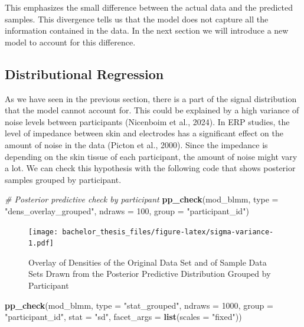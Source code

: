 \documentclass[
  doc,12pt,floatsintext]{apa7}
\newenvironment{Shaded}{\begin{snugshade}}{\end{snugshade}}
\newcommand{\AttributeTok}[1]{\textcolor[rgb]{0.13,0.29,0.53}{#1}}
\newcommand{\CommentTok}[1]{\textcolor[rgb]{0.56,0.35,0.01}{\textit{#1}}}
\newcommand{\DecValTok}[1]{\textcolor[rgb]{0.00,0.00,0.81}{#1}}
\newcommand{\FunctionTok}[1]{\textcolor[rgb]{0.13,0.29,0.53}{\textbf{#1}}}
\newcommand{\NormalTok}[1]{#1}
\newcommand{\StringTok}[1]{\textcolor[rgb]{0.31,0.60,0.02}{#1}}
\begin{document}
This emphasizes the small difference between the actual data and the predicted samples. This divergence tells us that the model does not capture all the information contained in the data. In the next section we will introduce a new model to account for this difference.

\subsection{Distributional Regression}\label{distributional-regression}

As we have seen in the previous section, there is a part of the signal distribution that the model cannot account for. This could be explained by a high variance of noise levels between participants (Nicenboim et al., 2024). In ERP studies, the level of impedance between skin and electrodes has a significant effect on the amount of noise in the data (Picton et al., 2000). Since the impedance is depending on the skin tissue of each participant, the amount of noise might vary a lot. We can check this hypothesis with the following code that shows posterior samples grouped by participant.



\begin{Shaded}
\begin{Highlighting}[]
\CommentTok{\# Posterior predictive check by participant}
\FunctionTok{pp\_check}\NormalTok{(mod\_blmm, }
         \AttributeTok{type =} \StringTok{"dens\_overlay\_grouped"}\NormalTok{,}
         \AttributeTok{ndraws =} \DecValTok{100}\NormalTok{,}
         \AttributeTok{group =} \StringTok{"participant\_id"}\NormalTok{)}
\end{Highlighting}
\end{Shaded}

\begin{figure}
\centering
\texttt{[image: bachelor\_thesis\_files/figure-latex/sigma-variance-1.pdf]}
\caption{\label{fig:sigma-variance}Overlay of Densities of the Original Data Set and of Sample Data Sets Drawn from the Posterior Predictive Distribution Grouped by Participant}
\end{figure}



\begin{Shaded}
\begin{Highlighting}[]
\FunctionTok{pp\_check}\NormalTok{(mod\_blmm,}
         \AttributeTok{type =} \StringTok{"stat\_grouped"}\NormalTok{,}
         \AttributeTok{ndraws =} \DecValTok{1000}\NormalTok{,}
         \AttributeTok{group =} \StringTok{"participant\_id"}\NormalTok{,}
         \AttributeTok{stat =} \StringTok{"sd"}\NormalTok{,}
         \AttributeTok{facet\_args =} \FunctionTok{list}\NormalTok{(}\AttributeTok{scales =} \StringTok{"fixed"}\NormalTok{))}
\end{Highlighting}
\end{Shaded}
\end{document}
